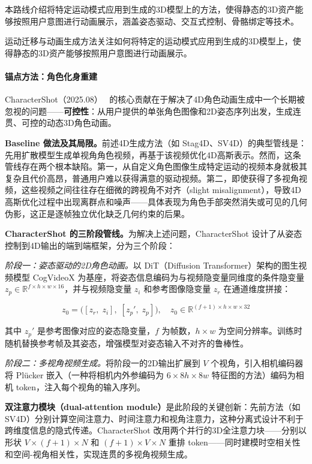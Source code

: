 本路线介绍将特定运动模式应用到生成的3D模型上的方法，使得静态的3D资产能够按照用户意图进行动画展示，涵盖姿态驱动、交互式控制、骨骼绑定等技术。

运动迁移与动画生成方法关注如何将特定的运动模式应用到生成的3D模型上，使得静态的3D资产能够按照用户意图进行动画展示。

\paragraph{锚点方法：角色化身重建}

CharacterShot（2025.08）~\cite{2508_07409} 的核心贡献在于解决了4D角色动画生成中一个长期被忽视的问题——\textbf{可控性}：从用户提供的单张角色图像和2D姿态序列出发，生成连贯、可控的动态3D角色动画。

\textbf{Baseline 做法及其局限。}前述4D生成方法（如 Stag4D、SV4D）的典型管线是：先用扩散模型生成单视角角色视频，再基于该视频优化4D高斯表示。然而，这条管线存在两个根本缺陷。第一，从自定义角色图像生成特定运动的视频本身就极其复杂且代价高昂，普通用户难以获得满意的驱动视频。第二，即使获得了多视角视频，这些视频之间往往存在细微的跨视角不对齐（slight misalignment），导致4D高斯优化过程中出现离群点和噪声——具体表现为角色手部突然消失或可见的几何伪影，这正是逐帧独立优化缺乏几何约束的后果。

\textbf{CharacterShot 的三阶段管线。}为解决上述问题，CharacterShot 设计了从姿态控制到4D输出的端到端框架，分为三个阶段：

\textit{阶段一：姿态驱动的2D角色动画。}以 DiT（Diffusion Transformer）架构的图生视频模型 CogVideoX 为基座，将姿态信息编码为与视频隐变量同维度的条件隐变量 $z_p \in \mathbb{R}^{f \times h \times w \times 16}$，并与视频隐变量 $z_i$ 和参考图像隐变量 $z_r$ 在通道维度拼接：

\begin{equation}
\label{eq:charactershot_stage1}
z_0 = \big([z_r,\; z_i],\; [z_p',\; z_p]\big), \quad z_0 \in \mathbb{R}^{(f+1) \times h \times w \times 32}
\end{equation}

其中 $z_p'$ 是参考图像对应的姿态隐变量，$f$ 为帧数，$h \times w$ 为空间分辨率。训练时随机替换参考帧及其姿态，增强模型对姿态输入不对齐的鲁棒性。

\textit{阶段二：多视角视频生成。}将阶段一的2D输出扩展到 $V$ 个视角，引入相机编码器将 Pl\"ucker 嵌入（一种将相机内外参编码为 $6 \times 8h \times 8w$ 特征图的方法）编码为相机 token，注入每个视角的输入序列。

\textbf{双注意力模块（dual-attention module）}是此阶段的关键创新：先前方法（如 SV4D）分别计算空间注意力、时间注意力和视角注意力，这种分离式设计不利于跨维度信息的隐式传递。CharacterShot 改用两个并行的3D全注意力块——分别以形状 $V \times (f+1) \times N$ 和 $(f+1) \times V \times N$ 重排 token——同时建模时空相关性和空间-视角相关性，实现连贯的多视角视频生成。


